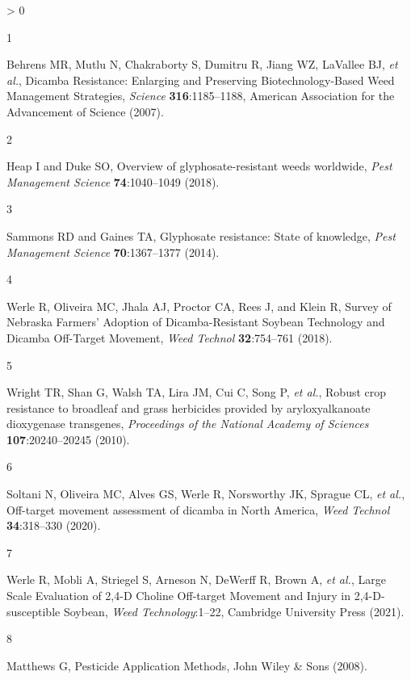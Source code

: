 \documentclass[
  12pt,
  a4paper,
]{article}
\newlength{\cslhangindent}
\newlength{\csllabelwidth}
\newenvironment{CSLReferences}[2] %
 {%
  \setlength{\parindent}{0pt}
  \ifodd #1 \everypar{\setlength{\hangindent}{\cslhangindent}}\ignorespaces\fi
  \ifnum #2 > 0
  \setlength{\parskip}{#2\baselineskip}
  \fi
 }%
 {}
\newcommand{\CSLLeftMargin}[1]{\parbox[t]{\csllabelwidth}{#1}}
\newcommand{\CSLRightInline}[1]{\parbox[t]{\linewidth - \csllabelwidth}{#1}\break}
\begin{document}
\hypertarget{refs}{}
\begin{CSLReferences}{1}{0}
\leavevmode\hypertarget{ref-behrens2007}{}%
\CSLLeftMargin{1 }
\CSLRightInline{Behrens MR, Mutlu N, Chakraborty S, Dumitru R, Jiang WZ,
LaVallee BJ, \emph{et al.}, Dicamba {Resistance}: {Enlarging} and
{Preserving Biotechnology}-{Based Weed Management Strategies},
\emph{Science} \textbf{316}:1185--1188, {American Association for the
Advancement of Science} (2007).}

\leavevmode\hypertarget{ref-heap2018}{}%
\CSLLeftMargin{2 }
\CSLRightInline{Heap I and Duke SO, Overview of glyphosate-resistant
weeds worldwide, \emph{Pest Management Science} \textbf{74}:1040--1049
(2018).}

\leavevmode\hypertarget{ref-sammons2014}{}%
\CSLLeftMargin{3 }
\CSLRightInline{Sammons RD and Gaines TA, Glyphosate resistance: State
of knowledge, \emph{Pest Management Science} \textbf{70}:1367--1377
(2014).}

\leavevmode\hypertarget{ref-werle2018}{}%
\CSLLeftMargin{4 }
\CSLRightInline{Werle R, Oliveira MC, Jhala AJ, Proctor CA, Rees J, and
Klein R, Survey of {Nebraska Farmers}' {Adoption} of
{Dicamba}-{Resistant Soybean Technology} and {Dicamba Off}-{Target
Movement}, \emph{Weed Technol} \textbf{32}:754--761 (2018).}

\leavevmode\hypertarget{ref-wright2010}{}%
\CSLLeftMargin{5 }
\CSLRightInline{Wright TR, Shan G, Walsh TA, Lira JM, Cui C, Song P,
\emph{et al.}, Robust crop resistance to broadleaf and grass herbicides
provided by aryloxyalkanoate dioxygenase transgenes, \emph{Proceedings
of the National Academy of Sciences} \textbf{107}:20240--20245 (2010).}

\leavevmode\hypertarget{ref-soltaniOfftargetMovementAssessment2020}{}%
\CSLLeftMargin{6 }
\CSLRightInline{Soltani N, Oliveira MC, Alves GS, Werle R, Norsworthy
JK, Sprague CL, \emph{et al.}, Off-target movement assessment of dicamba
in {North America}, \emph{Weed Technol} \textbf{34}:318--330 (2020).}

\leavevmode\hypertarget{ref-werle2021}{}%
\CSLLeftMargin{7 }
\CSLRightInline{Werle R, Mobli A, Striegel S, Arneson N, DeWerff R,
Brown A, \emph{et al.}, Large {Scale Evaluation} of 2,4-{D Choline
Off}-target {Movement} and {Injury} in 2,4-{D}-susceptible {Soybean},
\emph{Weed Technology}:1--22, {Cambridge University Press} (2021).}

\leavevmode\hypertarget{ref-matthews2008}{}%
\CSLLeftMargin{8 }
\CSLRightInline{Matthews G, Pesticide {Application Methods}, {John Wiley
\& Sons} (2008).}


\end{CSLReferences}
\end{document}
